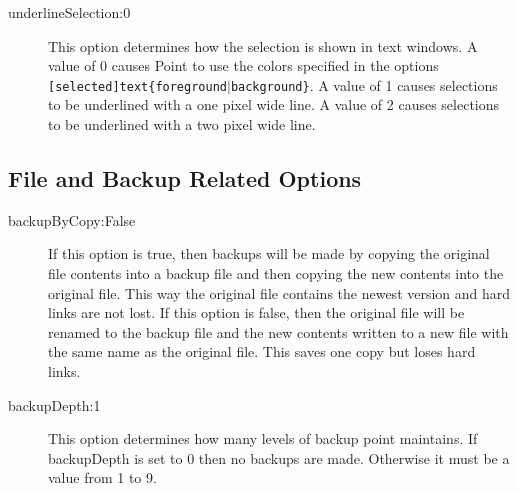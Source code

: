 \begin{description}
\item[underlineSelection:0]
This option determines how the selection is shown in text windows.
A value of 0 causes Point to use the colors specified in the
options {\tt [selected]text\{foreground$\mid$background\}}.
A value of 1 causes selections to be underlined with a one pixel wide line.
A value of 2 causes selections to be underlined with a two pixel wide line.

\end{description}


\subsection{File and Backup Related Options}

\begin{description}

\item[backupByCopy:False]
If this option is true, then backups will be made by copying the
original file contents into a backup file and then copying the
new contents into the original file.
This way the original file contains the newest version and
hard links are not lost.
If this option is false, then the original file will be
renamed to the backup file and the new contents written to
a new file with the same name as the original file.
This saves one copy but loses hard links.

\item[backupDepth:1]
This option determines how many levels of backup point maintains.
If backupDepth is set to 0 then no backups are made.
Otherwise it must be a value from 1 to 9.


\end{description}
